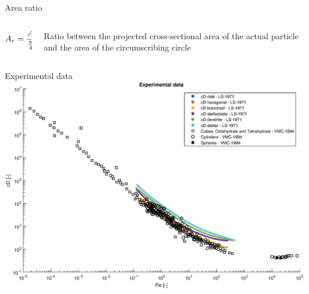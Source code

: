 \documentclass[11pt]{beamer}
\begin{document}
	\begin{frame}
		\begin{block}{Area ratio}
			\vfill
			\begin{columns}[T]
				\begin{column}{.4\textwidth}
					\begin{equation*}
					A_r = \dfrac{A_{\textup{p}, \perp}}{\frac{\pi}{4}\ d_{\textup{c}}^2}
					\end{equation*}	
				\end{column}
				
				\begin{column}{.6\textwidth}
					Ratio between the projected cross-sectional area of the actual particle and the area of the circumscribing circle
				\end{column}
			\end{columns}
		\end{block}
	\end{frame}
	
	\begin{frame}{Experimental data}
		\centering
		\includegraphics[height=\textheight,width=\textwidth,keepaspectratio] {exp_data.eps}		
	\end{frame}
	
\end{document}
